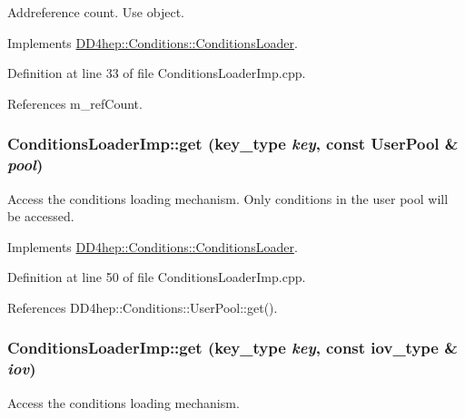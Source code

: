 Addreference count. Use object. 

Implements \hyperlink{class_d_d4hep_1_1_conditions_1_1_conditions_loader_aec8e8abc8bbb54bf20f75c8197b8e71f}{DD4hep::Conditions::ConditionsLoader}.

Definition at line 33 of file ConditionsLoaderImp.cpp.

References m\_\-refCount.\hypertarget{class_d_d4hep_1_1_conditions_1_1_conditions_loader_imp_a742f7d5a8d3d0666ee64baa3502982ce}{
\subsubsection[{get}]{ ConditionsLoaderImp::get ({\bf key\_\-type} {\em key}, \/  const {\bf UserPool} \& {\em pool})}}
\label{class_d_d4hep_1_1_conditions_1_1_conditions_loader_imp_a742f7d5a8d3d0666ee64baa3502982ce}


Access the conditions loading mechanism. Only conditions in the user pool will be accessed. 

Implements \hyperlink{class_d_d4hep_1_1_conditions_1_1_conditions_loader_a9d8cacc0e3520074b386d157906a376f}{DD4hep::Conditions::ConditionsLoader}.

Definition at line 50 of file ConditionsLoaderImp.cpp.

References DD4hep::Conditions::UserPool::get().\hypertarget{class_d_d4hep_1_1_conditions_1_1_conditions_loader_imp_a0144aac3062bb704dd2c9557bed207da}{
\subsubsection[{get}]{ ConditionsLoaderImp::get ({\bf key\_\-type} {\em key}, \/  const {\bf iov\_\-type} \& {\em iov})}}
\label{class_d_d4hep_1_1_conditions_1_1_conditions_loader_imp_a0144aac3062bb704dd2c9557bed207da}


Access the conditions loading mechanism. 

